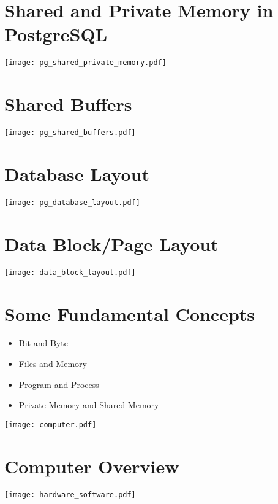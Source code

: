 \documentclass[en,hazy,blue,screen,14pt]{elegantnote}
\begin{document}
\newpage
\section{Shared and Private Memory in PostgreSQL}
\centerline{\texttt{[image: pg\_shared\_private\_memory.pdf]}}

\newpage
\section{Shared Buffers}
\centerline{\texttt{[image: pg\_shared\_buffers.pdf]}}

\newpage
\section{Database Layout}
\centerline{\texttt{[image: pg\_database\_layout.pdf]}}

\newpage
\section{Data Block/Page Layout}
\centerline{\texttt{[image: data\_block\_layout.pdf]}}

\iffalse
\newpage
\section{Some Fundamental Concepts}
\begin{itemize}
	\item Bit and Byte
	\item Files and Memory
	\item Program and Process
	\item Private Memory and Shared Memory
\end{itemize}

\centerline{\texttt{[image: computer.pdf]}}

\newpage
\section{Computer Overview}
\centerline{\texttt{[image: hardware\_software.pdf]}}

\newpage
\end{document}
